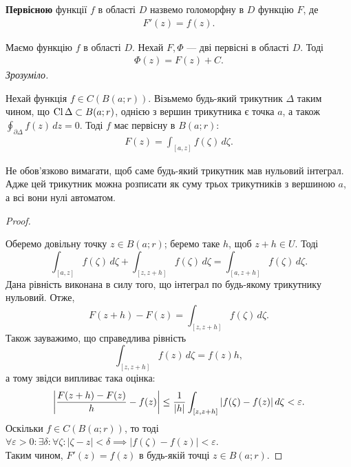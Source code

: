 \documentclass{math_library}
\begin{document}
\begin{definition}
\textbf{Первісною} функції $f$ в області $D$ назвемо голоморфну в $D$ функцію $F$, де
\begin{align*}
F'(z) = f(z).
\end{align*}
\end{definition}

\begin{theorem}
Маємо функцію $f$ в області $D$. Нехай $F,\Phi$ --- дві первісні в області $D$. Тоді
\begin{align*}
\Phi(z) = F(z) + C.
\end{align*}
\textit{Зрозуміло.}
\end{theorem}

\begin{lemma}
Нехай функція $f \in C(B(a;r))$. Візьмемо будь-який трикутник $\Delta$ таким чином, що $\operatorname{Cl} \Delta \subset B(a;r)$, однією з вершин трикутника є точка $a$, а також $\displaystyle\oint_{\partial \Delta} f(z)\,dz = 0$. Тоді $f$ має первісну в $B(a;r)$:
\begin{align*}
F(z) = \displaystyle\int_{[a,z]} f(\zeta)\,d\zeta.
\end{align*}
\end{lemma}

\begin{remark}
Не обов'язково вимагати, щоб саме будь-який трикутник мав нульовий інтеграл. Адже цей трикутник можна розписати як суму трьох трикутників з вершиною $a$, а всі вони нулі автоматом.
\end{remark}

\begin{proof}
\begin{figure}[H]
\centering
{}
\end{figure}
Оберемо довільну точку $z \in B(a;r)$; беремо таке $h$, щоб $z+h \in U$. Тоді
\[
\int_{[a,z]} f(\zeta)\,d\zeta + \int_{[z,z+h]} f(\zeta)\,d\zeta = \int_{[a,z+h]} f(\zeta)\,d\zeta.
\]
Дана рівність виконана в силу того, що інтеграл по будь-якому трикутнику нульовий. Отже,
\[
F(z+h)-F(z) = \displaystyle\int_{[z,z+h]} f(\zeta)\,d\zeta.
\]
Також зауважимо, що справедлива рівність 
\[
\int_{[z,z+h]} f(z)\,d\zeta = f(z)h,
\]
а тому звідси випливає така оцінка:
\[
\abs{\dfrac{F(z+h)-F(z)}{h}-f(z)} \leq \dfrac{1}{|h|} \displaystyle\int_{[z,z+h]} |f(\zeta) - f(z)|\,d\zeta < \varepsilon.
\]
Оскільки $f \in C(B(a;r))$, то тоді $\forall \varepsilon > 0: \exists \delta: \forall \zeta: |\zeta-z| < \delta \implies |f(\zeta)-f(z)| < \varepsilon$.\\
Таким чином, $F'(z) = f(z)$ в будь-якій точці $z \in B(a;r)$.
\end{proof}
\end{document}
